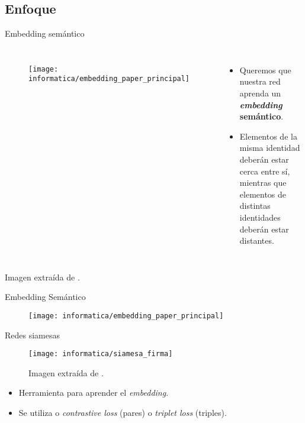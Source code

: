 \subsection{Enfoque}

\begin{frame}{Embedding semántico}
	\begin{columns}
		\centering
		\begin{figure}
			\texttt{[image: informatica/embedding\_paper\_principal]}
		\end{figure}
		\begin{itemize}
			\item Queremos que nuestra red aprenda un \textbf{\textit{embedding} semántico}.
			\item Elementos de la misma identidad deberán estar cerca entre sí, mientras que elementos de distintas identidades deberán estar distantes.
		\end{itemize}
	\end{columns}
	Imagen extraída de .
\end{frame}

\begin{frame}{Embedding Semántico}
	\begin{figure}
		\texttt{[image: informatica/embedding\_paper\_principal]}
	\end{figure}
\end{frame}

\begin{frame}{Redes siamesas}

	\begin{figure}
		\texttt{[image: informatica/siamesa\_firma]}
		\caption{Imagen extraída de .}
		\label{img:siamesa_firma}
	\end{figure}

	\begin{itemize}
		\item Herramienta para aprender el \textit{embedding}.
		\item Se utiliza o \textit{contrastive loss} (pares) o \textit{triplet loss} (triples).
	\end{itemize}

\end{frame}

